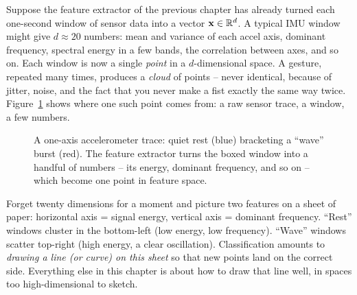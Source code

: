 Suppose the feature extractor of the previous chapter has already turned each one-second
window of sensor data into a vector $\mathbf{x} \in \mathbb{R}^d$. A typical IMU window might give
$d \approx 20$ numbers: mean and variance of each accel axis, dominant frequency,
spectral energy in a few bands, the correlation between axes, and so on. Each window is
now a single \emph{point} in a $d$-dimensional space. A gesture, repeated many times,
produces a \emph{cloud} of points -- never identical, because of jitter, noise, and the
fact that you never make a fist exactly the same way twice. Figure~\ref{ch39:fig-imu-trace}
shows where one such point comes from: a raw sensor trace, a window, a few numbers.

\begin{figure}[H]
\centering
{}
\caption{A one-axis accelerometer trace: quiet rest (blue) bracketing a ``wave'' burst
(red). The feature extractor turns the boxed window into a handful of numbers -- its
energy, dominant frequency, and so on -- which become one point in feature space.}
\label{ch39:fig-imu-trace}
\end{figure}

\begin{intuitionbox}
Forget twenty dimensions for a moment and picture two features on a sheet of paper:
horizontal axis = signal energy, vertical axis = dominant frequency. ``Rest'' windows
cluster in the bottom-left (low energy, low frequency). ``Wave'' windows scatter
top-right (high energy, a clear oscillation). Classification amounts to
\emph{drawing a line (or curve) on this sheet} so that new points land on the correct
side. Everything else in this chapter is about how to draw that line well, in spaces
too high-dimensional to sketch.
\end{intuitionbox}


